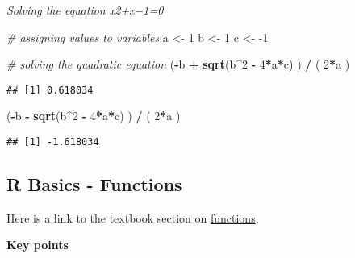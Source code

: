 \documentclass[
]{article}
\newenvironment{Shaded}{\begin{snugshade}}{\end{snugshade}}
\newcommand{\CommentTok}[1]{\textcolor[rgb]{0.56,0.35,0.01}{\textit{#1}}}
\newcommand{\DecValTok}[1]{\textcolor[rgb]{0.00,0.00,0.81}{#1}}
\newcommand{\KeywordTok}[1]{\textcolor[rgb]{0.13,0.29,0.53}{\textbf{#1}}}
\newcommand{\NormalTok}[1]{#1}
\newcommand{\OperatorTok}[1]{\textcolor[rgb]{0.81,0.36,0.00}{\textbf{#1}}}
\newcommand{\StringTok}[1]{\textcolor[rgb]{0.31,0.60,0.02}{#1}}
\begin{document}
\emph{Solving the equation x2+x−1=0}

\begin{Shaded}
\begin{Highlighting}[]
\CommentTok{# assigning values to variables}
\NormalTok{a <-}\StringTok{ }\DecValTok{1}
\NormalTok{b <-}\StringTok{ }\DecValTok{1}
\NormalTok{c <-}\StringTok{ }\DecValTok{-1}

\CommentTok{# solving the quadratic equation}
\NormalTok{(}\OperatorTok{-}\NormalTok{b }\OperatorTok{+}\StringTok{ }\KeywordTok{sqrt}\NormalTok{(b}\OperatorTok{^}\DecValTok{2} \OperatorTok{-}\StringTok{ }\DecValTok{4}\OperatorTok{*}\NormalTok{a}\OperatorTok{*}\NormalTok{c) ) }\OperatorTok{/}\StringTok{ }\NormalTok{( }\DecValTok{2}\OperatorTok{*}\NormalTok{a )}
\end{Highlighting}
\end{Shaded}

\begin{verbatim}
## [1] 0.618034
\end{verbatim}

\begin{Shaded}
\begin{Highlighting}[]
\NormalTok{(}\OperatorTok{-}\NormalTok{b }\OperatorTok{-}\StringTok{ }\KeywordTok{sqrt}\NormalTok{(b}\OperatorTok{^}\DecValTok{2} \OperatorTok{-}\StringTok{ }\DecValTok{4}\OperatorTok{*}\NormalTok{a}\OperatorTok{*}\NormalTok{c) ) }\OperatorTok{/}\StringTok{ }\NormalTok{( }\DecValTok{2}\OperatorTok{*}\NormalTok{a )}
\end{Highlighting}
\end{Shaded}

\begin{verbatim}
## [1] -1.618034
\end{verbatim}

\hypertarget{r-basics---functions}{%
\subsection{R Basics - Functions}\label{r-basics---functions}}

Here is a link to the textbook section on
\href{https://rafalab.github.io/dsbook/r-basics.html\#functions}{functions}.

\textbf{Key points}
\end{document}
